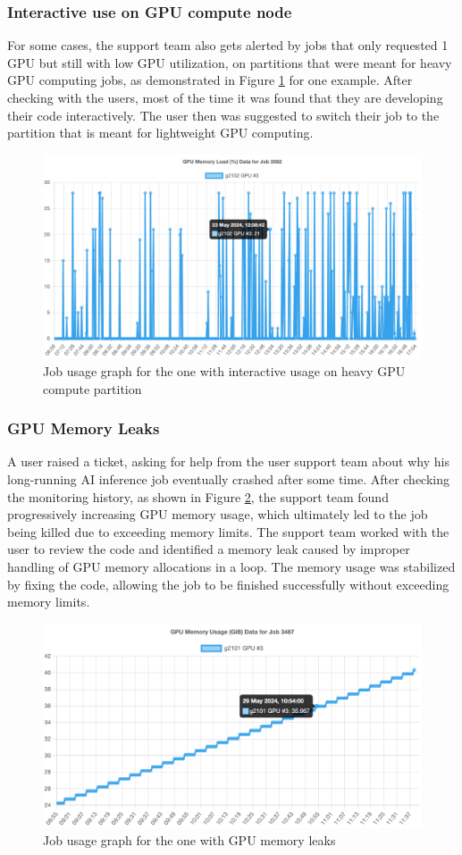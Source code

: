 \subsubsection{Interactive use on GPU compute node}
For some cases, the support team also gets alerted by jobs that only requested 1 GPU but still with low GPU utilization, on partitions that were meant for heavy GPU computing jobs, as demonstrated in Figure \ref{fig_job_interactive} for one example. After checking with the users, most of the time it was found that they are developing their code interactively. The user then was suggested to switch their job to the partition that is meant for lightweight GPU computing.

\begin{figure}[H]
    \centering
    \includegraphics[width=1\textwidth]{figures/job-interactive.png}
    \caption{Job usage graph for the one with interactive usage on heavy GPU compute partition}
    \label{fig_job_interactive}
\end{figure}

\subsubsection{GPU Memory Leaks}
A user raised a ticket, asking for help from the user support team about why his long-running AI inference job eventually crashed after some time. After checking the monitoring history, as shown in Figure \ref{fig_job_memory_leak}, the support team found progressively increasing GPU memory usage, which ultimately led to the job being killed due to exceeding memory limits. The support team worked with the user to review the code and identified a memory leak caused by improper handling of GPU memory allocations in a loop. The memory usage was stabilized by fixing the code, allowing the job to be finished successfully without exceeding memory limits.

\begin{figure}[H]
    \centering
    \includegraphics[width=1\textwidth]{figures/job-memory-leak.png}
    \caption{Job usage graph for the one with GPU memory leaks}
    \label{fig_job_memory_leak}
\end{figure}
